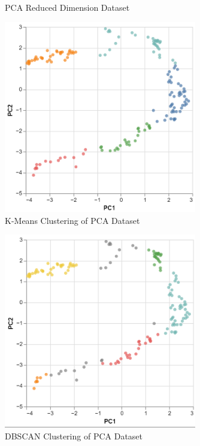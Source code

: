 \documentclass[twocolumn]{article}
\begin{document}
\begin{appendices}
\begin{figure}[h!]
    \caption{PCA Reduced Dimension Dataset}
    \label{pca}
\end{figure}
\FloatBarrier
\begin{figure}[h!]
    \centering
    \includegraphics[width=0.75\textwidth]{images/kmeans.png}
    \caption{K-Means Clustering of PCA Dataset}
    \label{kmeans}
\end{figure}
\FloatBarrier
\begin{figure}[h!]
    \centering
    \includegraphics[width=0.75\textwidth]{images/dbscan.png}
    \caption{DBSCAN Clustering of PCA Dataset}
    \label{dbscan}
\end{figure}
\FloatBarrier
\begin{figure}[h!]
    \centering

\end{figure}
\end{appendices}
\end{document}
